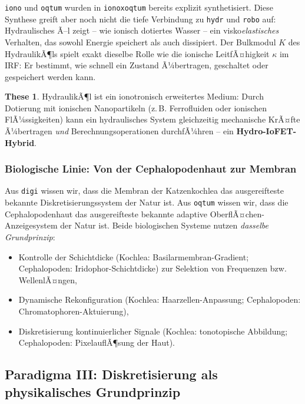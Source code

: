 ﻿\documentclass[a4paper,12pt]{scrreprt}
\theoremstyle{definition}
\newtheorem{these}{These}[section]
\begin{document}
\texttt{iono} und \texttt{oqtum} wurden in \texttt{ionoxoqtum} bereits
explizit synthetisiert. Diese Synthese greift aber noch nicht die tiefe
Verbindung zu \texttt{hydr} und \texttt{robo} auf: Hydraulisches Ã–l
zeigt -- wie ionisch dotiertes Wasser -- ein visko\emph{elastisches}
Verhalten, das sowohl Energie speichert als auch dissipiert. Der Bulkmodul
$K$ des HydraulikÃ¶ls spielt exakt dieselbe Rolle wie die ionische
LeitfÃ¤higkeit $\kappa$ im IRF: Er bestimmt, wie schnell ein Zustand
Ã¼bertragen, geschaltet oder gespeichert werden kann.

\begin{these}
  HydraulikÃ¶l ist ein ionotronisch erweitertes Medium: Durch Dotierung
  mit ionischen Nanopartikeln (z.\,B. Ferrofluiden oder ionischen
  FlÃ¼ssigkeiten) kann ein hydraulisches System gleichzeitig mechanische
  KrÃ¤fte Ã¼bertragen \emph{und} Berechnungsoperationen durchfÃ¼hren --
  ein \textbf{Hydro-IoFET-Hybrid}.
\end{these}

\subsubsection{Biologische Linie: Von der Cephalopodenhaut zur Membran}

Aus \texttt{digi} wissen wir, dass die Membran der Katzenkochlea das
ausgereifteste bekannte Diskretisierungssystem der Natur ist. Aus
\texttt{oqtum} wissen wir, dass die Cephalopodenhaut das ausgereifteste
bekannte adaptive OberflÃ¤chen-Anzeigesystem der Natur ist. Beide
biologischen Systeme nutzen \emph{dasselbe Grundprinzip}:

\begin{itemize}
  \item Kontrolle der Schichtdicke (Kochlea: Basilarmembran-Gradient;
    Cephalopoden: Iridophor-Schichtdicke) zur Selektion von
    Frequenzen bzw. WellenlÃ¤ngen,
  \item Dynamische Rekonfiguration (Kochlea: Haarzellen-Anpassung;
    Cephalopoden: Chro\-matophoren-Aktuierung),
  \item Diskretisierung kontinuierlicher Signale (Kochlea:
    tonotopische Abbildung; Cephalopoden: PixelauflÃ¶sung der Haut).
\end{itemize}

\subsection{Paradigma III: Diskretisierung als physikalisches Grundprinzip}
\label{ssec:paradigma3}
\end{document}
